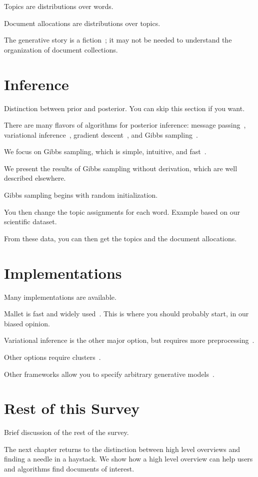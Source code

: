 Topics are distributions over words.

Document allocations are distributions over topics.

The generative story is a fiction~\citep{box-87}; it may not be needed
to understand the organization of document collections.

\section{Inference}

Distinction between prior and posterior.  You can skip this section if
you want.

There are many flavors of algorithms for posterior inference: message
passing~\citep{zeng-13}, variational inference~\citep{blei-03}, gradient
descent~\citep{hoffman-10}, and Gibbs sampling~\citep{griffiths-04}.

We focus on Gibbs sampling, which is simple, intuitive, and
fast~\citep{yao-09}.

We present the results of Gibbs sampling without derivation, which are
well described elsewhere.

Gibbs sampling begins with random initialization.

You then change the topic assignments for each word. Example based on
our scientific dataset.

From these data, you can then get the topics and the document
allocations.

\section{Implementations}

Many implementations are available.

Mallet is fast and widely used~\citep{mallet}.  This is where you
should probably start, in our biased opinion.

Variational inference is the other major option, but requires more
preprocessing~\citep{blei-03,vw}.

Other options require clusters~\citep{Narayanamurthy-11,zhai-12}.

Other frameworks allow you to specify arbitrary generative
models~\citep{stan-software:2014}.

\section{Rest of this Survey}

Brief discussion of the rest of the survey.

The next chapter returns to the distinction between high level
overviews and finding a needle in a haystack.  We show how a high
level overview can help users and algorithms find documents of
interest.